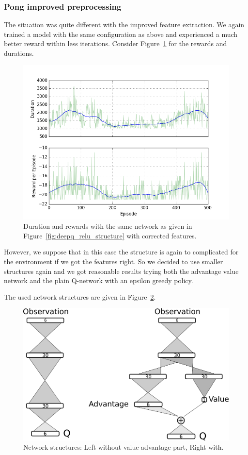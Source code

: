 \documentclass[10pt,a4paper]{article}
\begin{document}
\FloatBarrier
\subsubsection{Pong improved preprocessing}

The situation was quite different with the improved feature extraction. We again trained a model with the same configuration as above and experienced a much better reward within less iterations. Consider Figure~\ref{fig:deep_corrected} for the rewards and durations.

\begin{figure}[!ht]
  \centering
  \includegraphics[width=1\textwidth]{./figures/relu_corrected.png}
  \caption{Duration and rewards with the same network as given in Figure~\ref{fig:deepq_relu_structure} with corrected features.}
  \label{fig:deep_corrected}
\end{figure}

However, we suppose that in this case the structure is again to complicated for the environment if we got the features right.
So we decided to use smaller structures again and we got reasonable results trying both the advantage value network and the plain Q-network with an epsilon greedy policy.

The used network structures are given in Figure~\ref{fig:pong_comparison}.

\begin{figure}[!ht]
  \centering
  \includegraphics[width=.7\textwidth]{./figures/structure.png}
  \caption{Network structures: Left without value advantage part, Right with.}
  \label{fig:pong_comparison}
\end{figure}
\end{document}
